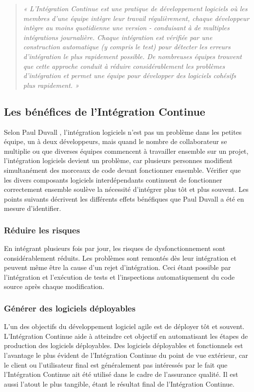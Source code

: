 \documentclass{report}
\begin{document}
    \begin{quotation}
      \emph{« L'Intégration Continue est une pratique de développement logiciels où les membres d'une équipe intègre leur travail régulièrement, chaque développeur intègre au moins quotidienne une version - conduisant à de multiples intégrations journalière. Chaque intégration est vérifiée par une construction automatique (y compris le test) pour détecter les erreurs d'intégration le plus rapidement possible. De nombreuses équipes trouvent que cette approche conduit à réduire considérablement les problèmes d'intégration et permet une équipe pour développer des logiciels cohésifs plus rapidement. »}\\
    \end{quotation}

      \subsection{Les bénéfices de l’Intégration Continue}
      Selon Paul Duvall \cite{Duv07}, l'intégration logiciels n’est pas un problème dans les petites équipe, un à deux développeurs, mais quand le nombre de collaborateur se multiplie ou que diverses équipes commencent à travailler ensemble sur un projet, l'intégration logiciels devient un problème, car plusieurs personnes modifient simultanément des morceaux de code devant fonctionner ensemble. Vérifier que les divers composants logiciels interdépendants continuent de fonctionner correctement ensemble soulève la nécessité d'intégrer plus tôt et plus souvent. Les points suivants décrivent les différents effets bénéfiques que Paul Duvall a été en mesure d'identifier.

        \subsubsection{Réduire les risques}
        En intégrant plusieurs fois par jour, les risques de dysfonctionnement sont considérablement réduits. Les problèmes sont remontés dès leur intégration et peuvent même être la cause d’un rejet d’intégration. Ceci étant possible par l’intégration et l’exécution de tests et l’inspections automatiquement du code source après chaque modification.

        \subsubsection{Générer des logiciels déployables}
        L'un des objectifs du développement logiciel agile est de déployer tôt et souvent. L’Intégration Continue aide à atteindre cet objectif en automatisant les étapes de production des logiciels déployables. Des logiciels déployables et fonctionnels est l'avantage le plus évident de l’Intégration Continue du point de vue extérieur, car le client ou l'utilisateur final est généralement pas intéressés par le fait que l’Intégration Continue ait été utilisé dans le cadre de l'assurance qualité. Il est aussi l'atout le plus tangible, étant le résultat final de l’Intégration Continue.
\end{document}
